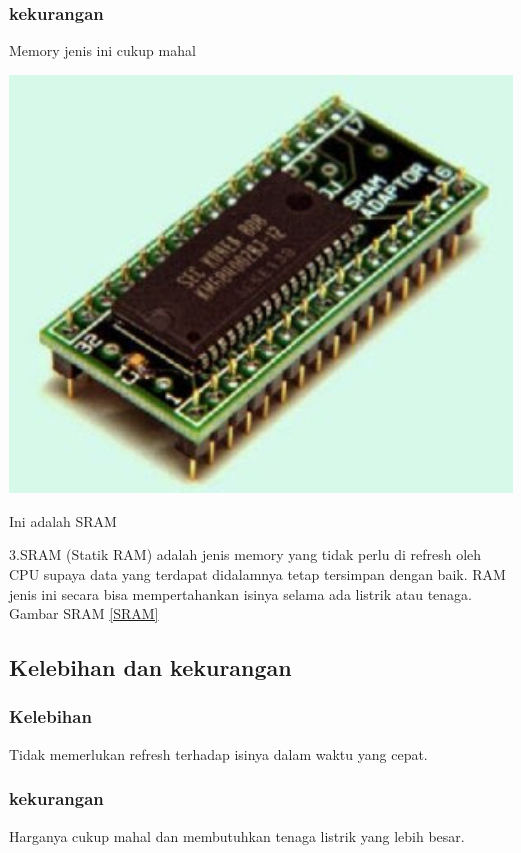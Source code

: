     \subsubsection{kekurangan}
    \-Memory jenis ini cukup mahal

  \begin{figures}[ht]
  \centerline{\includegraphics[width=1\textwidth]{figures/SRAM.jpg}}
  \caption{Ini adalah SRAM}
  \label{SRAM}
  \end{figures}

3.SRAM (Statik RAM) adalah jenis memory yang tidak perlu di refresh oleh CPU supaya data yang terdapat didalamnya tetap tersimpan dengan baik.
RAM jenis ini secara bisa mempertahankan isinya selama ada listrik atau tenaga.
Gambar SRAM \ref{SRAM}
  \subsection{Kelebihan dan kekurangan}
    \subsubsection{Kelebihan}
    \-Tidak memerlukan refresh terhadap isinya dalam waktu yang cepat.
    \subsubsection{kekurangan}
    \-Harganya cukup mahal dan membutuhkan tenaga listrik yang lebih besar.

